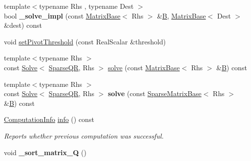 \begin{DoxyCompactItemize}
\mbox{\label{group___sparse_q_r___module_ad8a931d66ec8b8b6d383752f142242ad}} 
{\footnotesize template$<$typename Rhs , typename Dest $>$ }\\bool {\bfseries \+\_\+solve\+\_\+impl} (const \hyperlink{group___core___module_class_eigen_1_1_matrix_base}{Matrix\+Base}$<$ Rhs $>$ \&\hyperlink{group___core___module_class_eigen_1_1_matrix}{B}, \hyperlink{group___core___module_class_eigen_1_1_matrix_base}{Matrix\+Base}$<$ Dest $>$ \&dest) const
\item 
void \hyperlink{group___sparse_q_r___module_adb7bfa65f99e3ef91ed58ea663a850a1}{set\+Pivot\+Threshold} (const Real\+Scalar \&threshold)
\item 
{\footnotesize template$<$typename Rhs $>$ }\\const \hyperlink{group___core___module_class_eigen_1_1_solve}{Solve}$<$ \hyperlink{group___sparse_q_r___module_class_eigen_1_1_sparse_q_r}{Sparse\+QR}, Rhs $>$ \hyperlink{group___sparse_q_r___module_aea13a2c6823cd8408ba49afde9b3d4e4}{solve} (const \hyperlink{group___core___module_class_eigen_1_1_matrix_base}{Matrix\+Base}$<$ Rhs $>$ \&\hyperlink{group___core___module_class_eigen_1_1_matrix}{B}) const
\item 
\mbox{\label{group___sparse_q_r___module_a8a0a30096cfe15383f2a3cd5ba6cb5a4}} 
{\footnotesize template$<$typename Rhs $>$ }\\const \hyperlink{group___core___module_class_eigen_1_1_solve}{Solve}$<$ \hyperlink{group___sparse_q_r___module_class_eigen_1_1_sparse_q_r}{Sparse\+QR}, Rhs $>$ {\bfseries solve} (const \hyperlink{group___sparse_core___module_class_eigen_1_1_sparse_matrix_base}{Sparse\+Matrix\+Base}$<$ Rhs $>$ \&\hyperlink{group___core___module_class_eigen_1_1_matrix}{B}) const
\item 
\hyperlink{group__enums_ga85fad7b87587764e5cf6b513a9e0ee5e}{Computation\+Info} \hyperlink{group___sparse_q_r___module_a234b0580aaf57237393f2e73a3d38690}{info} () const
\begin{DoxyCompactList}\small\item\em Reports whether previous computation was successful. \end{DoxyCompactList}\item 
\mbox{\label{group___sparse_q_r___module_a056948dc591c1030164c2dda73664640}} 
void {\bfseries \+\_\+sort\+\_\+matrix\+\_\+Q} ()
\end{DoxyCompactItemize}
